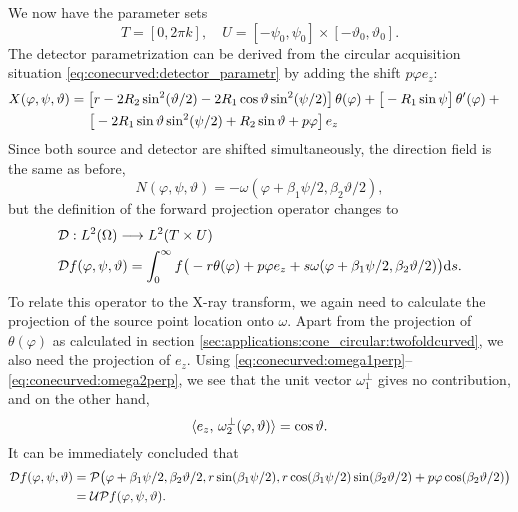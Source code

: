 \documentclass{amsart}
\renewcommand*{\phi}{\varphi}
\begin{document}
We now have the parameter sets
%
\begin{equation}
 \label{eq:hconecurved:params}
 T = [0, 2\pi k], \quad U = [-\psi_0, \psi_0] \times [-\vartheta_0, \vartheta_0].
\end{equation}
%
The detector parametrization can be derived from the circular acquisition situation \eqref{eq:conecurved:detector_parametr} by adding the 
shift $p \phi e_z$:
%
\begin{align}
 \label{eq:hconecurved:detector_parametr}
 X(\phi, \psi, \vartheta)
 &= \big[ r - 2R_2 \sin^2(\vartheta/2) - 2R_1 \cos\vartheta \sin^2(\psi/2) \big]\, \theta(\phi) + \big[-R_1 \sin\psi\big]\, 
 \theta'(\phi) + \phantom{x} \\
 &\hspace{14pt} \big[ -2R_1 \sin\vartheta\sin^2(\psi/2) + R_2\sin\vartheta + p\phi \big]\, e_z \notag 
\end{align}
%
Since both source and detector are shifted simultaneously, the direction field is the same as before,
%
\begin{equation}
 \label{eq:hconecurved:direction_field}
 N(\phi, \psi, \vartheta) = -\omega(\phi + \beta_1\psi/2, \beta_2\vartheta/2),
\end{equation} 
%
but the definition of the forward projection operator changes to
%
\begin{align}
 &\OPD: L^2(\Omega) \Lto L^2(T \times U) \notag \\
 \label{eq:hconecurved:fwdproj}
 &\OPD f(\phi, \psi, \vartheta) = \int_0^\infty f\big(-r\theta(\phi) + p\phi e_z + s \omega(\phi + \beta_1\psi/2, \beta_2\vartheta/2)\big)
 \D s.
\end{align}
%
To relate this operator to the X-ray transform, we again need to calculate the projection of the source point location onto $\omega$. Apart 
from the projection of $\theta(\phi)$ as calculated in section \ref{sec:applications:cone_circular:twofoldcurved}, we also need the 
projection of $e_z$. Using \eqref{eq:conecurved:omega1perp}--\eqref{eq:conecurved:omega2perp}, we see that the unit vector 
$\omega_1^\perp$ gives no contribution, and on the other hand,
%
\begin{equation*}
 \INNER{e_z}{\omega_2^\perp(\phi, \vartheta)} = \cos\vartheta.
\end{equation*}
%
%
It can be immediately concluded that
%
\begin{align*}
 \OPD f(\phi, \psi, \vartheta) 
 &= \OPP\big( \phi + \beta_1\psi/2, \beta_2\vartheta/2, r\sin(\beta_1\psi/2), r\cos(\beta_1\psi/2)\sin(\beta_2\vartheta/2) + 
 p\phi \cos(\beta_2\vartheta/2) \big) \\
 &= \OPU \OPP f(\phi, \psi, \vartheta).
\end{align*}
\end{document}
